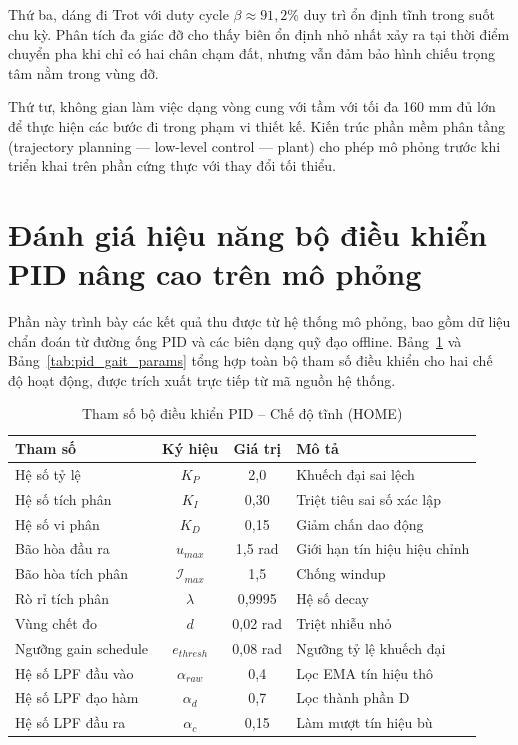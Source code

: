 Thứ ba, dáng đi Trot với duty cycle $\beta \approx 91{,}2\%$ duy trì ổn định tĩnh trong suốt chu kỳ. Phân tích đa giác đỡ cho thấy biên ổn định nhỏ nhất xảy ra tại thời điểm chuyển pha khi chỉ có hai chân chạm đất, nhưng vẫn đảm bảo hình chiếu trọng tâm nằm trong vùng đỡ.

Thứ tư, không gian làm việc dạng vòng cung với tầm với tối đa 160 mm đủ lớn để thực hiện các bước đi trong phạm vi thiết kế. Kiến trúc phần mềm phân tầng (trajectory planning --- low-level control --- plant) cho phép mô phỏng trước khi triển khai trên phần cứng thực với thay đổi tối thiểu.

\section{Đánh giá hiệu năng bộ điều khiển PID nâng cao trên mô phỏng}

Phần này trình bày các kết quả thu được từ hệ thống mô phỏng, bao gồm dữ liệu chẩn đoán từ đường ống PID và các biên dạng quỹ đạo offline. Bảng~\ref{tab:pid_home_params} và Bảng~\ref{tab:pid_gait_params} tổng hợp toàn bộ tham số điều khiển cho hai chế độ hoạt động, được trích xuất trực tiếp từ mã nguồn hệ thống.

\begin{table}[H]
\centering
\caption{Tham số bộ điều khiển PID -- Chế độ tĩnh (HOME)}
\label{tab:pid_home_params}
\renewcommand{\arraystretch}{1.3}
\begin{tabular}{|l|c|c|l|}
\hline
\textbf{Tham số} & \textbf{Ký hiệu} & \textbf{Giá trị} & \textbf{Mô tả} \\ \hline
Hệ số tỷ lệ & $K_P$ & 2,0 & Khuếch đại sai lệch \\ \hline
Hệ số tích phân & $K_I$ & 0,30 & Triệt tiêu sai số xác lập \\ \hline
Hệ số vi phân & $K_D$ & 0,15 & Giảm chấn dao động \\ \hline
Bão hòa đầu ra & $u_{max}$ & 1,5 rad & Giới hạn tín hiệu hiệu chỉnh \\ \hline
Bão hòa tích phân & $\mathcal{I}_{max}$ & 1,5 & Chống windup \\ \hline
Rò rỉ tích phân & $\lambda$ & 0,9995 & Hệ số decay \\ \hline
Vùng chết đo & $d$ & 0,02 rad & Triệt nhiễu nhỏ \\ \hline
Ngưỡng gain schedule & $e_{thresh}$ & 0,08 rad & Ngưỡng tỷ lệ khuếch đại \\ \hline
Hệ số LPF đầu vào & $\alpha_{raw}$ & 0,4 & Lọc EMA tín hiệu thô \\ \hline
Hệ số LPF đạo hàm & $\alpha_d$ & 0,7 & Lọc thành phần D \\ \hline
Hệ số LPF đầu ra & $\alpha_c$ & 0,15 & Làm mượt tín hiệu bù \\ \hline
\end{tabular}
\end{table}

